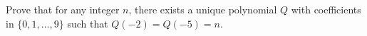 Prove that for any integer $n$,  there exists a unique polynomial $Q$ with coefficients in $\{0,1,\ldots,9\}$ such that $Q(-2) = Q(-5) = n$.